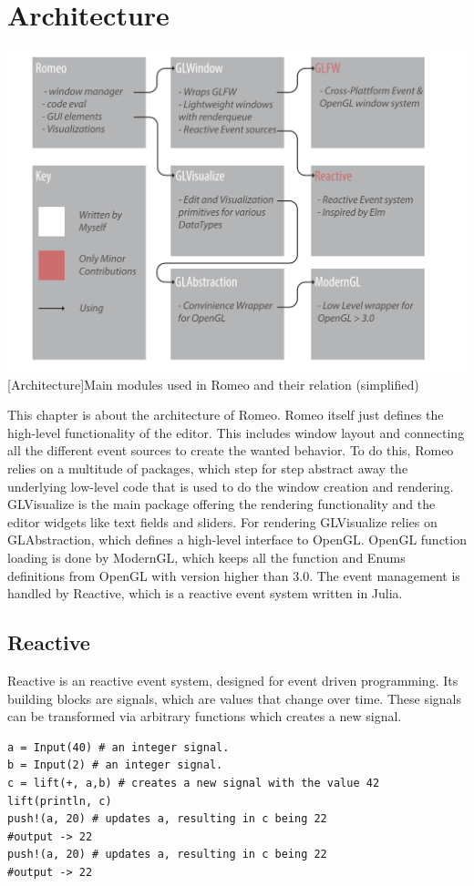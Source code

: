 \section{Architecture}

\vspace{1em}
\begin{minipage}{\linewidth}
    \centering
    \includegraphics[width=0.9\linewidth]{graphics/architecture.pdf}
    [Architecture]{Main modules used in Romeo and their relation (simplified)}
    \label{fig:architecture} 
\end{minipage}


This chapter is about the architecture of Romeo.
Romeo itself just defines the high-level functionality of the editor.
This includes window layout and connecting all the different event sources to create the wanted behavior.
To do this, Romeo relies on a multitude of packages, which step for step abstract away the underlying low-level code that is used to do the window creation and rendering.
GLVisualize is the main package offering the rendering functionality and the editor widgets like text fields and sliders.
For rendering GLVisualize relies on GLAbstraction, which defines a high-level interface to OpenGL.
OpenGL function loading is done by ModernGL, which keeps all the function and Enums definitions from OpenGL with version higher than 3.0.
The event management is handled by Reactive, which is a reactive event system written in Julia.

\subsection{Reactive}

Reactive is an reactive event system, designed for event driven programming.
Its building blocks are signals, which are values that change over time.
These signals can be transformed via arbitrary functions which creates a new signal. 
\begin{lstlisting}
a = Input(40) # an integer signal.
b = Input(2) # an integer signal.
c = lift(+, a,b) # creates a new signal with the value 42
lift(println, c) 
push!(a, 20) # updates a, resulting in c being 22
#output -> 22
push!(a, 20) # updates a, resulting in c being 22
#output -> 22
\end{lstlisting}



